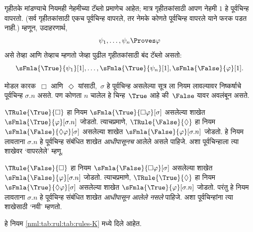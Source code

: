 गृहीतके मांडण्याचे नियमही नेहमीच्या टॅब्लो
प्रमाणेच आहेत; मात्र गृहीतकांसाठी आपण नेहमी
$1$ हे पूर्वचिन्ह वापरतो. (सर्व गृहीतकांसाठी एकच
पूर्वचिन्ह वापरले, तर नेमके कोणते पूर्वचिन्ह
वापरले याने फरक पडत नाही.) म्हणून, उदाहरणार्थ,
\[\psi_1, \dots, \psi_n \Proves \varphi
\]
असे तेव्हा आणि तेव्हाच म्हणतो जेव्हा पुढील
गृहीतकांसाठी बंद टॅब्लो असतो:
\[\sFmla{\True}{\psi_1}[1], \dots, \sFmla{\True}{\psi_n}[1],
\sFmla{\False}{\varphi}[1].
\]

मोडल कारक~$\Box$
    आणि~$\Diamond$
यांसाठी,~$\sigma$ हे पूर्वचिन्ह असलेल्या सूत्र
ला नियम लावल्यावर निष्कर्षाचे पूर्वचिन्ह
$\sigma.n$ असते. पण कोणता $n$ चालेल हे
चिन्ह~$\True$ आहे की~$\False$ यावर अवलंबून असते.

$\TRule{\True}{\Box}$ हा नियम
  $\sFmla{\True}{\Box \varphi}[\sigma]$ असलेल्या शाखेत
  $\sFmla{\True}{\varphi}[\sigma.n]$ जोडतो.
    त्याचप्रमाणे, $\TRule{\False}{\Diamond}$
  हा नियम $\sFmla{\False}{\Diamond \varphi}[\sigma]$
  असलेल्या शाखेत $\sFmla{\False}{\varphi}[\sigma.n]$
  जोडतो.
हे नियम
लावताना $\sigma.n$ हे पूर्वचिन्ह संबंधित शाखेत
\emph{आधीपासूनच} आलेले असले पाहिजे. अशा
पूर्वचिन्हाला त्या शाखेवर ‘वापरलेले’ म्हणू.

$\TRule{\False}{\Box}$ हा नियम
  $\sFmla{\False}{\Box \varphi}[\sigma]$ असलेल्या शाखेत
  $\sFmla{\False}{\varphi}[\sigma.n]$ जोडतो.
    त्याचप्रमाणे, $\TRule{\True}{\Diamond}$
  हा नियम $\sFmla{\True}{\Diamond \varphi}[\sigma]$
  असलेल्या शाखेत $\sFmla{\True}{\varphi}[\sigma.n]$
  जोडतो.
परंतु हे नियम
लावताना $\sigma.n$ हे पूर्वचिन्ह संबंधित शाखेत
\emph{आधीपासून आलेले नसले} पाहिजे. अशा
पूर्वचिन्हांना त्या शाखेसाठी ‘नवी’ म्हणतो.

हे नियम \ref{nml:tab:rul:tab:rules-K} मध्ये दिले आहेत.

